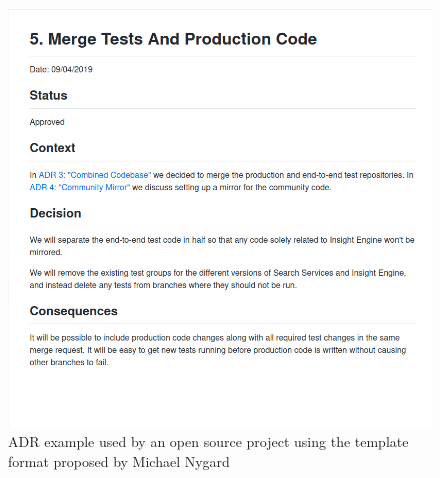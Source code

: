         \begin{figure}
            \includegraphics[scale=0.5]{figures/ADR_Example.png}
            \caption{ADR example used by an open source project using the template format proposed by Michael Nygard}
            \label{fig:ADR_Example_MN}
        \end{figure}

